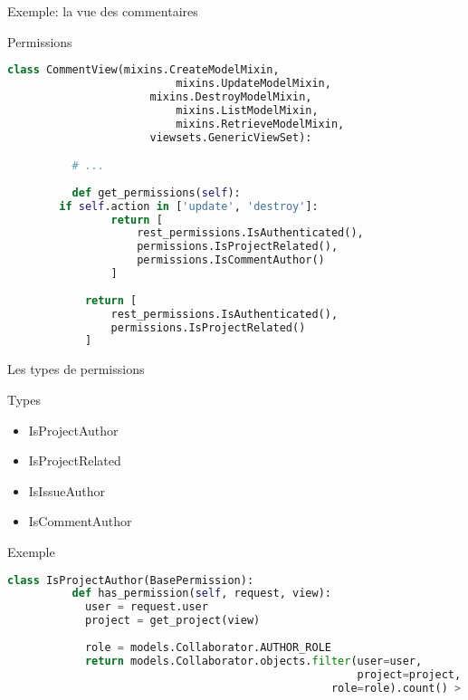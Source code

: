 \begin{frame}[fragile]{Exemple: la vue des commentaires}
  \begin{block}{Permissions}
    \begin{center}    
      \tiny
      \begin{lstlisting}[language=python]
        class CommentView(mixins.CreateModelMixin,
                          mixins.UpdateModelMixin,
	                  mixins.DestroyModelMixin,
                          mixins.ListModelMixin,
                          mixins.RetrieveModelMixin,
	                  viewsets.GenericViewSet):

          # ...
                          
          def get_permissions(self):
	    if self.action in ['update', 'destroy']:
                return [
                    rest_permissions.IsAuthenticated(),
                    permissions.IsProjectRelated(),
                    permissions.IsCommentAuthor()
                ]
            
            return [
                rest_permissions.IsAuthenticated(),
                permissions.IsProjectRelated()
            ]                
      \end{lstlisting}
    \end{center}
  \end{block}
\end{frame}

\begin{frame}[fragile]{Les types de permissions}
  \begin{block}{Types}
    \begin{itemize}
    \item IsProjectAuthor
    \item IsProjectRelated
    \item IsIssueAuthor
    \item IsCommentAuthor
    \end{itemize}
  \end{block}

  \begin{block}{Exemple}
    \begin{center}
      \tiny
      \begin{lstlisting}[language=python]
        class IsProjectAuthor(BasePermission):
          def has_permission(self, request, view):
            user = request.user
            project = get_project(view)
            
            role = models.Collaborator.AUTHOR_ROLE
            return models.Collaborator.objects.filter(user=user,
                                                      project=project,
	                                              role=role).count() > 0
      \end{lstlisting}
    \end{center}
  \end{block}
  
\end{frame}

